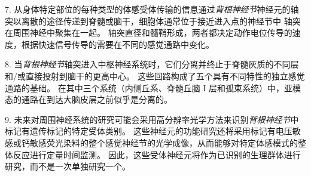 7. 从身体特定部位的每种类型的体感受体传输的信息通过\textit{背根神经节}神经元的轴突以离散的途径传递到脊髓或脑干，细胞体通常位于接近进入点的神经节中 轴突在周围神经中聚集在一起。
轴突直径和髓鞘形成，两者都决定动作电位传导的速度，根据快速信号传导的需要在不同的感觉通路中变化。


8. 当\textit{背根神经节}轴突进入中枢神经系统时，它们分离并终止于脊髓灰质的不同层和/或直接投射到脑干的更高中心。
这些回路构成了五个具有不同特性的独立感觉通路的基础。
在其中三个系统（内侧丘系、脊髓丘脑 I 层和孤束系统）中，亚模态的通路在到达大脑皮层之前似乎是分离的。


9. 未来对周围神经系统的研究可能会采用高分辨率光学方法来识别\textit{背根神经节}中标记有遗传标记的特定受体类别。
这些神经元的功能研究还将采用标记有电压敏感或钙敏感荧光染料的整个感觉神经节的光学成像，从而能够对特定体感模式的整体反应进行定量时间监测。
因此，这些受体神经元将作为已识别的生理群体进行研究，而不是一次单独研究一个。


